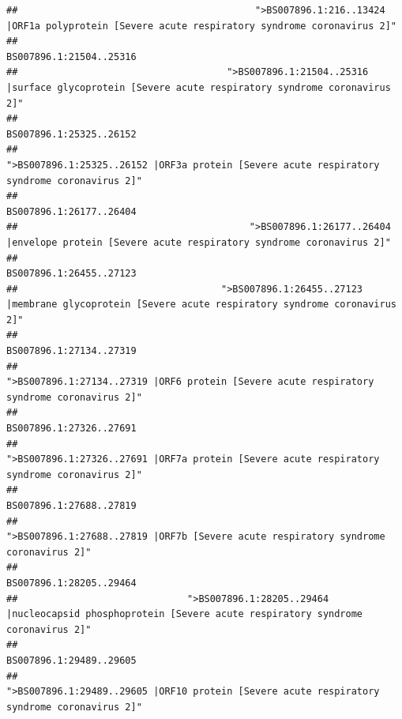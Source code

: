 \documentclass[
]{article}
\begin{document}
\begin{verbatim}
##                                          ">BS007896.1:216..13424 |ORF1a polyprotein [Severe acute respiratory syndrome coronavirus 2]" 
##                                                                                                                BS007896.1:21504..25316 
##                                     ">BS007896.1:21504..25316 |surface glycoprotein [Severe acute respiratory syndrome coronavirus 2]" 
##                                                                                                                BS007896.1:25325..26152 
##                                            ">BS007896.1:25325..26152 |ORF3a protein [Severe acute respiratory syndrome coronavirus 2]" 
##                                                                                                                BS007896.1:26177..26404 
##                                         ">BS007896.1:26177..26404 |envelope protein [Severe acute respiratory syndrome coronavirus 2]" 
##                                                                                                                BS007896.1:26455..27123 
##                                    ">BS007896.1:26455..27123 |membrane glycoprotein [Severe acute respiratory syndrome coronavirus 2]" 
##                                                                                                                BS007896.1:27134..27319 
##                                             ">BS007896.1:27134..27319 |ORF6 protein [Severe acute respiratory syndrome coronavirus 2]" 
##                                                                                                                BS007896.1:27326..27691 
##                                            ">BS007896.1:27326..27691 |ORF7a protein [Severe acute respiratory syndrome coronavirus 2]" 
##                                                                                                                BS007896.1:27688..27819 
##                                                    ">BS007896.1:27688..27819 |ORF7b [Severe acute respiratory syndrome coronavirus 2]" 
##                                                                                                                BS007896.1:28205..29464 
##                              ">BS007896.1:28205..29464 |nucleocapsid phosphoprotein [Severe acute respiratory syndrome coronavirus 2]" 
##                                                                                                                BS007896.1:29489..29605 
##                                            ">BS007896.1:29489..29605 |ORF10 protein [Severe acute respiratory syndrome coronavirus 2]" 

\end{verbatim}
\end{document}
